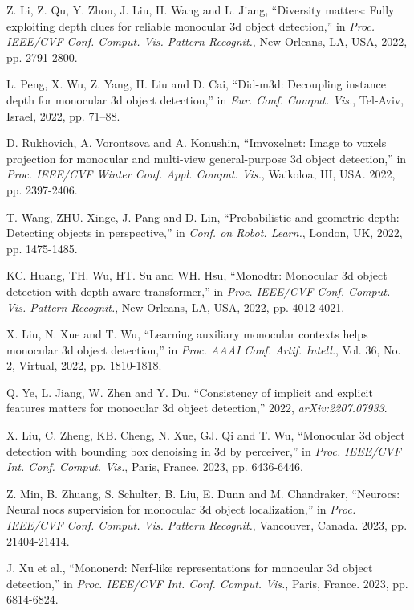 \documentclass[journal]{IEEEtran}
\begin{document}
\begin{thebibliography}{1}
		Z. Li, Z. Qu, Y. Zhou, J. Liu, H. Wang and L. Jiang, “Diversity matters: Fully exploiting depth clues for reliable monocular 3d object detection,” in \textit{Proc. IEEE/CVF Conf. Comput. Vis. Pattern Recognit.}, New Orleans, LA, USA, 2022, pp. 2791-2800.
		
		L. Peng, X. Wu, Z. Yang, H. Liu and D. Cai, “Did-m3d: Decoupling instance depth for monocular 3d object detection,” in \textit{Eur. Conf. Comput. Vis.}, Tel-Aviv, Israel, 2022, pp. 71–88.
		
		D. Rukhovich, A. Vorontsova and A. Konushin, “Imvoxelnet: Image to voxels projection for monocular and multi-view general-purpose 3d object detection,” in \textit{Proc. IEEE/CVF Winter Conf. Appl. Comput. Vis.}, Waikoloa, HI, USA. 2022, pp. 2397-2406.
		
		T. Wang, ZHU. Xinge, J. Pang and D. Lin, “Probabilistic and geometric depth: Detecting objects in perspective,” in \textit{Conf. on Robot. Learn.}, London, UK, 2022, pp. 1475-1485.
		
		KC. Huang, TH. Wu, HT. Su and WH. Hsu, “Monodtr: Monocular 3d object detection with depth-aware transformer,” in \textit{Proc. IEEE/CVF Conf. Comput. Vis. Pattern Recognit.}, New Orleans, LA, USA, 2022,  pp. 4012-4021.
		
		
		X. Liu, N. Xue and T. Wu, “Learning auxiliary monocular contexts helps monocular 3d object detection,” in \textit{Proc. AAAI Conf. Artif. Intell.}, Vol. 36, No. 2, Virtual, 2022, pp. 1810-1818.
		
		Q. Ye, L. Jiang, W. Zhen and Y. Du, “Consistency of implicit and explicit features matters for monocular 3d object detection,” 2022, \textit{arXiv:2207.07933}.
		
		X. Liu, C. Zheng, KB. Cheng, N. Xue, GJ. Qi and T. Wu, “Monocular 3d object detection with bounding box denoising in 3d by perceiver,” in \textit{Proc. IEEE/CVF Int. Conf. Comput. Vis.}, Paris, France. 2023, pp. 6436-6446.
		
		Z. Min, B. Zhuang, S. Schulter, B. Liu, E. Dunn and M. Chandraker, “Neurocs: Neural nocs supervision for monocular 3d object localization,” in \textit{Proc. IEEE/CVF Conf. Comput. Vis. Pattern Recognit.}, Vancouver, Canada. 2023, pp. 21404-21414. 
		
		J. Xu et al., “Mononerd: Nerf-like representations for monocular 3d object detection,” in \textit{Proc. IEEE/CVF Int. Conf. Comput. Vis.}, Paris, France. 2023, pp. 6814-6824. 
		

\end{thebibliography}
\end{document}

